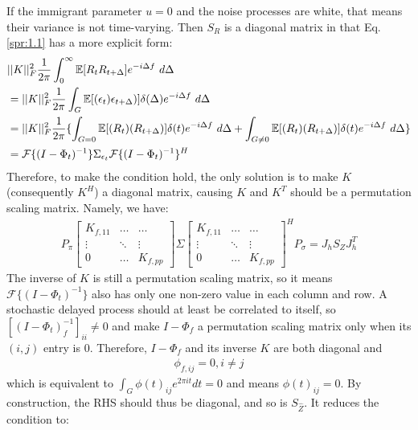 \documentclass[10pt]{article}
\numberwithin{figure}{section}
\begin{document}
If the immigrant parameter $u=0$ and the noise processes are white, that means their variance is not time-varying. Then $S_R$ is a diagonal matrix in that Eq.\eqref{spr:1.1} has a more explicit form:
    \begin{align}
    &||K||_F^2\frac{1}{2\pi}\int_{0}^{\infty}\mathbb{E}[R_tR_{t+\Delta}]e^{-i\Delta f}\ d\Delta \notag\\
    &= ||K||_F^2\frac{1}{2\pi}\int_{G}^{}\mathbb{E}[(\epsilon_t)\epsilon_{t+\Delta})]\delta(\Delta)e^{-i\Delta f}\ d\Delta \label{spr:2}\\
    &=||K||_F^2\frac{1}{2\pi}\{ \int_{G=0}^{}\mathbb{E}[(R_t)(R_{t+\Delta})]\delta(t)e^{-i\Delta f}\ d\Delta+ \int_{G\ne 0}^{}\mathbb{E}[(R_t)(R_{t+\Delta})]\delta(t)e^{-i\Delta f}\ d\Delta\} \label{spr:3}\\
    &= \mathcal{F}\{(I-\Phi_t)^{-1}\}\Sigma_{\epsilon_t}\mathcal{F}\{(I-\Phi_t)^{-1}\}^H \label{spr:4}
\end{align}
Therefore, to make the condition hold, the only solution is to make $K$ (consequently $K^H$) a diagonal matrix,  causing $K$ and $K^T$ should be a permutation scaling matrix. Namely, we have:
\begin{align}
    P_{\pi} \left [
    \begin{array}{ccc}
    K_{f,11} &  \dots & \dots  \\
    \vdots &  \ddots & \vdots\\
  0 & \dots & K_{f,pp}
\end{array}
    \right]\Sigma\left [
    \begin{array}{ccc}
    K_{f,11} &  \dots & \dots  \\
    \vdots &  \ddots & \vdots\\
  0 & \dots & K_{f,pp}
\end{array}
    \right]^HP_{\sigma}=J_hS_{Z}J_h^{T}
\end{align}
The inverse of $K$ is still a permutation scaling matrix, so it means $\mathcal{F}\{(I-\Phi_t)^{-1}\}$ also has only one non-zero value in each column and row.  A stochastic delayed process should at least be correlated to itself, so $[(I-\Phi_t)^{-1}_{f}]_{ii}\ne 0$ and make $I-\Phi_f$ a permutation scaling matrix only when its $(i,j)$ entry is 0. Therefore, $I-\Phi_f$ and its inverse $K$ are both diagonal and
\begin{align}
    \phi_{f,ij}=0,i\ne j  
\end{align}
which is equivalent to $\int_{G}^{}\phi(t)_{ij}e^{2\pi it}dt = 0$ and means $\phi(t)_{ij}=0$. By construction, the RHS should thus be diagonal, and so is $S_{\hat Z}$.  It reduces the condition to:
\end{document}
